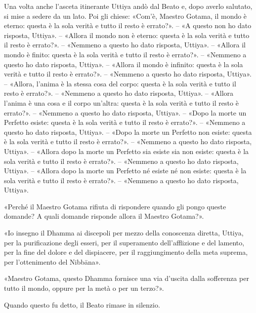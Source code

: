 

Una volta anche l’asceta itinerante Uttiya andò dal Beato e, dopo averlo
salutato, si mise a sedere da un lato. Poi gli chiese: «Com’è, Maestro
Gotama, il mondo è eterno: questa è la sola verità e tutto il resto è
errato?». – «A questo non ho dato risposta, Uttiya». – «Allora il mondo
non è eterno: questa è la sola verità e tutto il resto è errato?». –
«Nemmeno a questo ho dato risposta, Uttiya». – «Allora il mondo è
finito: questa è la sola verità e tutto il resto è errato?». – «Nemmeno
a questo ho dato risposta, Uttiya». – «Allora il mondo è infinito:
questa è la sola verità e tutto il resto è errato?». – «Nemmeno a questo
ho dato risposta, Uttiya». – «Allora, l’anima è la stessa cosa del
corpo: questa è la sola verità e tutto il resto è errato?». – «Nemmeno a
questo ho dato risposta, Uttiya». – «Allora l’anima è una cosa e il
corpo un’altra: questa è la sola verità e tutto il resto è errato?». –
«Nemmeno a questo ho dato risposta, Uttiya». – «Dopo la morte un
Perfetto esiste: questa è la sola verità e tutto il resto è errato?». –
«Nemmeno a questo ho dato risposta, Uttiya». – «Dopo la morte un
Perfetto non esiste: questa è la sola verità e tutto il resto è
errato?». – «Nemmeno a questo ho dato risposta, Uttiya». – «Allora dopo
la morte un Perfetto sia esiste sia non esiste: questa è la sola verità
e tutto il resto è errato?». – «Nemmeno a questo ho dato risposta,
Uttiya». – «Allora dopo la morte un Perfetto né esiste né non esiste:
questa è la sola verità e tutto il resto è errato?». – «Nemmeno a questo
ho dato risposta, Uttiya».


«Perché il Maestro Gotama rifiuta di rispondere quando gli pongo queste
domande? A quali domande risponde allora il Maestro Gotama?».


«Io insegno il Dhamma ai discepoli per mezzo della conoscenza diretta,
Uttiya, per la purificazione degli esseri, per il superamento
dell’afflizione e del lamento, per la fine del dolore e del dispiacere,
per il raggiungimento della meta suprema, per l’ottenimento del
Nibbāna».


«Maestro Gotama, questo Dhamma fornisce una via d’uscita dalla
sofferenza per tutto il mondo, oppure per la metà o per un terzo?».


Quando questo fu detto, il Beato rimase in silenzio.


